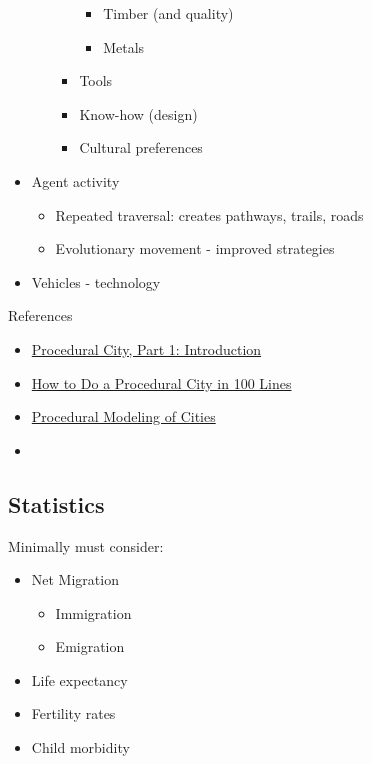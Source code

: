 \documentclass[]{article}
\begin{document}
\begin{itemize}
\begin{itemize}
\begin{itemize}
      \begin{itemize}
      \itemsep1pt\parskip0pt
      \item
        Timber (and quality)
      \item
        Metals
      \end{itemize}
    \item
      Tools
    \item
      Know-how (design)
    \item
      Cultural preferences
    \end{itemize}
  \end{itemize}
\item
  Agent activity

  \begin{itemize}
  \itemsep1pt\parskip0pt
  \item
    Repeated traversal: creates pathways, trails, roads
  \item
    Evolutionary movement - improved strategies
  \end{itemize}
\item
  Vehicles - technology
\end{itemize}

References

\begin{itemize}
\itemsep1pt\parskip0pt
\item
  \href{http://www.shamusyoung.com/twentysidedtale/?p=2940}{Procedural
  City, Part 1: Introduction}
\item
  \href{http://learningthreejs.com/blog/2013/08/02/how-to-do-a-procedural-city-in-100lines/}{How
  to Do a Procedural City in 100 Lines}
\item
  \href{http://graphics.ethz.ch/Downloads/Publications/Papers/2001/p_Par01.pdf}{Procedural
  Modeling of Cities}
\item
  \href{http://www.vision.ee.ethz.ch/~pmueller/documents/procedural_modeling_of_cities__siggraph2001.pdf}{}
\end{itemize}

\subsection{Statistics}\label{statistics}

Minimally must consider:

\begin{itemize}
\itemsep1pt\parskip0pt
\item
  Net Migration

  \begin{itemize}
  \itemsep1pt\parskip0pt
  \item
    Immigration
  \item
    Emigration
  \end{itemize}
\item
  Life expectancy
\item
  Fertility rates
\item
  Child morbidity
\end{itemize}
\end{document}
